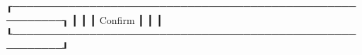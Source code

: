 ┎─────────────────────────────────────────────────────────┒
┃                                                         ┃
┃                         Confirm                         ┃
┃                                                         ┃
┖─────────────────────────────────────────────────────────┚